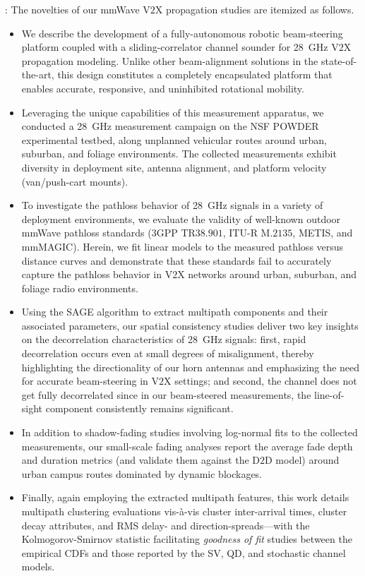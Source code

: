 \documentclass[10pt, twocolumn]{IEEEtran}
\begin{document}
: The novelties of our mmWave V$2$X propagation studies are itemized as follows.
\begin{itemize}[leftmargin=*]
    \item We describe the development of a fully-autonomous robotic beam-steering platform coupled with a sliding-correlator channel sounder for \SI{28}{\giga\hertz} V$2$X propagation modeling. Unlike other beam-alignment solutions in the state-of-the-art, this design constitutes a completely encapsulated platform that enables accurate, responsive, and uninhibited rotational mobility.
    \item Leveraging the unique capabilities of this measurement apparatus, we conducted a \SI{28}{\giga\hertz} measurement campaign on the NSF POWDER experimental testbed, along unplanned vehicular routes around urban, suburban, and foliage environments. The collected measurements exhibit diversity in deployment site, antenna alignment, and platform velocity (van/push-cart mounts).
    \item To investigate the pathloss behavior of \SI{28}{\giga\hertz} signals in a variety of deployment environments, we evaluate the validity of well-known outdoor mmWave pathloss standards ($3$GPP TR$38.901$, ITU-R M$.2135$, METIS, and mmMAGIC). Herein, we fit linear models to the measured pathloss versus distance curves and demonstrate that these standards fail to accurately capture the pathloss behavior in V$2$X networks around urban, suburban, and foliage radio environments.
    \item Using the SAGE algorithm to extract multipath components and their associated parameters, our spatial consistency studies deliver two key insights on the decorrelation characteristics of \SI{28}{\giga\hertz} signals: first, rapid decorrelation occurs even at small degrees of misalignment, thereby highlighting the directionality of our horn antennas and emphasizing the need for accurate beam-steering in V$2$X settings; and second, the channel does not get fully decorrelated since in our beam-steered measurements, the line-of-sight component consistently remains significant.
    \item In addition to shadow-fading studies involving log-normal fits to the collected measurements, our small-scale fading analyses report the average fade depth and duration metrics (and validate them against the D$2$D model) around urban campus routes dominated by dynamic blockages.
    \item Finally, again employing the extracted multipath features, this work details multipath clustering evaluations vis-\`{a}-vis cluster inter-arrival times, cluster decay attributes, and RMS delay- and direction-spreads---with the Kolmogorov-Smirnov statistic facilitating \emph{goodness of fit} studies between the empirical CDFs and those reported by the SV, QD, and stochastic channel models.
\end{itemize}
\end{document}
